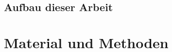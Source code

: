\documentclass[german,version-2022-01]{uzl-thesis}
\begin{document}
%


\section{Aufbau dieser Arbeit}


%



%


\chapter{Material und Methoden}%
\label{chapter-use}
\end{document}
